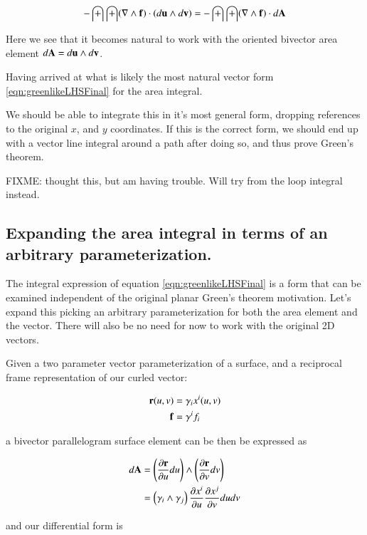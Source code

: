 \documentclass{article}
\newcommand{\grad}[0]{\nabla}
\newcommand{\PD}[2]{\frac{\partial {#2}}{\partial {#1}}}
\begin{document}
\begin{equation}\label{eqn:greenlikeLHSFinal}
-\int\int (\grad \wedge \Bf) \cdot (d\Bu \wedge d\Bv) = -\int\int (\grad \wedge \Bf) \cdot d\BA
\end{equation}

Here we see that it becomes natural to work with the oriented bivector area element $d\mathbf{A} = d\mathbf{u} \wedge d\mathbf{v}$.

Having arrived at what is likely the most natural vector form \ref{eqn:greenlikeLHSFinal} for the area
integral.

We should be able to 
integrate this in it's most general form, dropping references to the original $x$, and $y$ coordinates.
If this is the correct form, we should end up with a vector line integral around a path after doing so, and thus prove
Green's theorem.

FIXME: thought this, but am having trouble.  Will try from the loop integral instead.

\subsection{ Expanding the area integral in terms of an arbitrary parameterization. }

The integral expression of equation \ref{eqn:greenlikeLHSFinal} is a form that can be examined independent of the original planar Green's theorem motivation.  Let's expand
this picking an arbitrary parameterization for both the area element and the vector.  There will also be no need for now to work with the original 2D vectors.

Given a two parameter vector parameterization of a surface, and a reciprocal frame representation of our curled vector:

\begin{align*}
\mathbf{r}(u,v) &= \gamma_i {x^i}(u,v) \\
\mathbf{f} &= \gamma^i {f_i}
\end{align*}

a bivector parallelogram surface element can be then be expressed as

\begin{align*}
d\BA 
&= \left(\PD{u}{\Br} du\right) \wedge \left(\PD{v}{\Br} dv\right) \\
&= \left(\gamma_i \wedge \gamma_j \right) \PD{u}{x^i} \PD{v}{x^j} du dv \\
\end{align*}

and our differential form is
\end{document}
